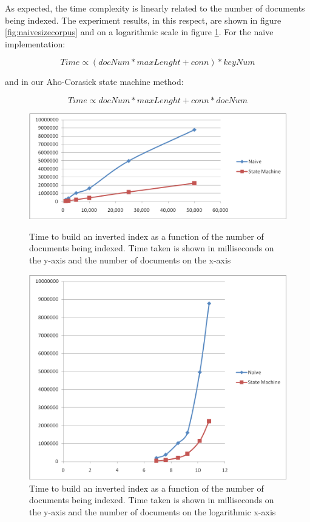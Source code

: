 \documentclass[10pt]{article}
\begin{document}
As expected, the time complexity is linearly related to the number of
documents being indexed. The experiment results, in this respect, are
shown in figure \ref{fig:naivesizecorpus} and on a logarithmic scale
in figure \ref{fig:naivesizecorpuslog}. For the na\"{i}ve
implementation:

\[Time \propto (docNum * maxLenght + conn) * keyNum\]
 
and in our Aho-Corasick state machine method: 

\[Time \propto docNum * maxLenght + conn * docNum\]


\begin{figure}[ht]
  \begin{minipage}[b]{0.5\linewidth}
    \centering
    \includegraphics[width=\textwidth]{naivesizecorpus}
    \caption{Time to build an inverted index as a function of the
      number of documents being indexed. Time taken is shown in
      milliseconds on the y-axis and the number of documents on the
      x-axis} 
    \label{fig:naivesizecorpus}
  \end{minipage}
  \hspace{0.5cm}
  \begin{minipage}[b]{0.5\linewidth}
    \centering
    \includegraphics[width=\textwidth]{naivesizecorpuslog}
    \caption{Time to build an inverted index as a function of the
    number of documents being indexed. Time taken is shown in
      milliseconds on the y-axis and the number of documents on the
      logarithmic x-axis} 
  \label{fig:naivesizecorpuslog}
  \end{minipage}
\end{figure}
\end{document}

